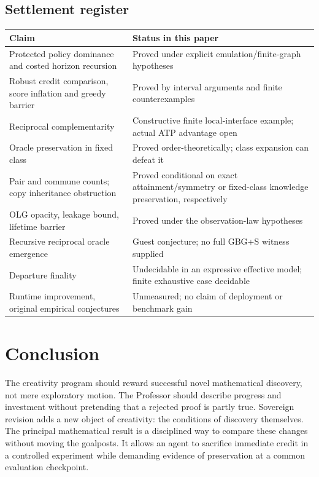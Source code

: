 \documentclass[11pt]{article}
\theoremstyle{definition}\newtheorem{definition}[theorem]{Definition}\newtheorem{conjecture}[theorem]{Conjecture}\newtheorem{example}[theorem]{Example}
\begin{document}
\subsection{Settlement register}
\begin{center}\small
\begin{tabularx}{\linewidth}{@{}p{.44\linewidth}X@{}}\toprule
Claim & Status in this paper\\\midrule
Protected policy dominance and costed horizon recursion & Proved under explicit emulation/finite-graph hypotheses\\
Robust credit comparison, score inflation and greedy barrier & Proved by interval arguments and finite counterexamples\\
Reciprocal complementarity & Constructive finite local-interface example; actual ATP advantage open\\
Oracle preservation in fixed class & Proved order-theoretically; class expansion can defeat it\\
Pair and commune counts; copy inheritance obstruction & Proved conditional on exact attainment/symmetry or fixed-class knowledge preservation, respectively\\
OLG opacity, leakage bound, lifetime barrier & Proved under the observation-law hypotheses\\
Recursive reciprocal oracle emergence & Guest conjecture; no full GBG+S witness supplied\\
Departure finality & Undecidable in an expressive effective model; finite exhaustive case decidable\\
Runtime improvement, original empirical conjectures & Unmeasured; no claim of deployment or benchmark gain\\\bottomrule
\end{tabularx}
\end{center}
\section{Conclusion}
The creativity program should reward successful novel mathematical discovery, not mere exploratory motion. The Professor should describe progress and investment without pretending that a rejected proof is partly true. Sovereign revision adds a new object of creativity: the conditions of discovery themselves. The principal mathematical result is a disciplined way to compare these changes without moving the goalposts. It allows an agent to sacrifice immediate credit in a controlled experiment while demanding evidence of preservation at a common evaluation checkpoint.
\end{document}
